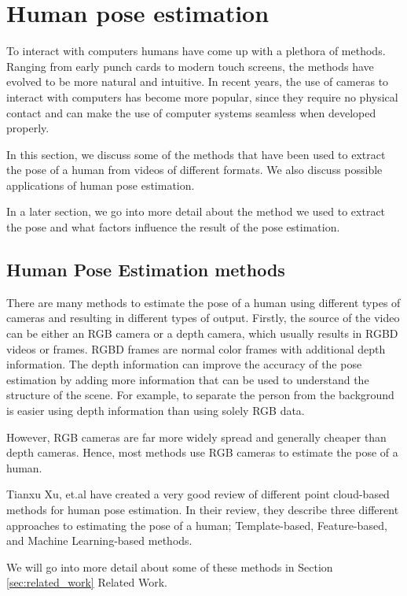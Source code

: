 \section{Human pose estimation}

To interact with computers humans have come up with a plethora of methods. Ranging from early punch cards to modern touch screens, the methods have evolved to be more natural and intuitive. In recent years, the use of cameras to interact with computers has become more popular, since they require no physical contact and can make the use of computer systems seamless when developed properly.

In this section, we discuss some of the methods that have been used to extract the pose of a human from videos of different formats. We also discuss possible applications of human pose estimation.

In a later section, we go into more detail about the method we used to extract the pose and what factors influence the result of the pose estimation. 

\subsection{Human Pose Estimation methods}

There are many methods to estimate the pose of a human using different types of cameras and resulting in different types of output. Firstly, the source of the video can be either an RGB camera or a depth camera, which usually results in RGBD videos or frames. RGBD frames are normal color frames with additional depth information. The depth information can improve the accuracy of the pose estimation by adding more information that can be used to understand the structure of the scene. For example, to separate the person from the background is easier using depth information than using solely RGB data.

However, RGB cameras are far more widely spread and generally cheaper than depth cameras. Hence, most methods use RGB cameras to estimate the pose of a human.

Tianxu Xu, et.al have created a very good review of different point cloud-based methods for human pose estimation\cite{hpeReview2021}. In their review, they describe three different approaches to estimating the pose of a human; Template-based, Feature-based, and Machine Learning-based methods.

We will go into more detail about some of these methods in Section \ref{sec:related_work} Related Work.

